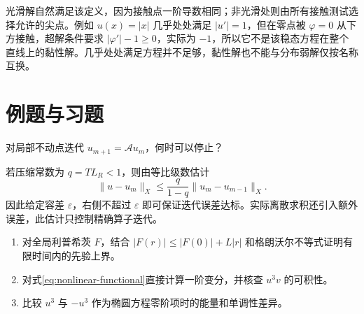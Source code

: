 光滑解自然满足该定义，因为接触点一阶导数相同；非光滑处则由所有接触测试选择允许的尖点。例如 $u(x)=|x|$ 几乎处处满足 $|u'|=1$，但在零点被 $\varphi=0$ 从下方接触，超解条件要求 $|\varphi'|-1\ge0$，实际为 $-1$，所以它不是该稳态方程在整个直线上的黏性解。几乎处处满足方程并不足够，黏性解也不能与分布弱解仅按名称互换。

\section{例题与习题}
\begin{example}
对局部不动点迭代 $u_{m+1}=\mathcal Au_m$，何时可以停止？
\end{example}
\begin{solve}
若压缩常数为 $q=TL_R<1$，则由等比级数估计
\[
 \|u-u_m\|_X\le\frac{q}{1-q}\|u_m-u_{m-1}\|_X.
\]
因此给定容差 $\varepsilon$，右侧不超过 $\varepsilon$ 即可保证迭代误差达标。实际离散求积还引入额外误差，此估计只控制精确算子迭代。
\end{solve}
\begin{enumerate}
 \item 对全局利普希茨 $F$，结合 $|F(r)|\le|F(0)|+L|r|$ 和格朗沃尔不等式证明有限时间内的先验上界。
 \item 对式\eqref{eq:nonlinear-functional}直接计算一阶变分，并核查 $u^3v$ 的可积性。
 \item 比较 $u^3$ 与 $-u^3$ 作为椭圆方程零阶项时的能量和单调性差异。
\end{enumerate}

